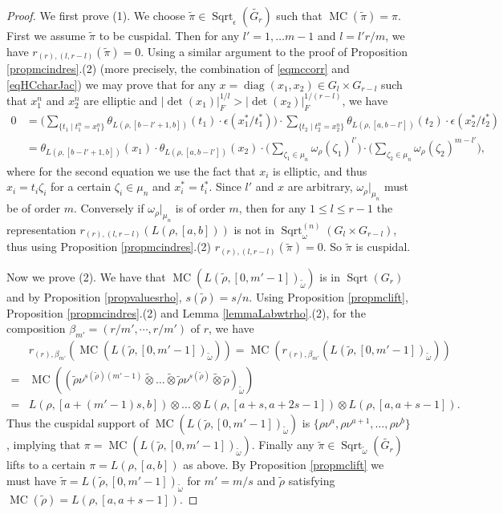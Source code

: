\documentclass{amsart}
\numberwithin{equation}{section}
\newcommand{\abs}[1]{\left|#1\right|_{F}}
\newcommand{\rest}{\lvert}
\newcommand{\mrdet}{\operatorname{det}}
\newcommand{\mrdiag}{\operatorname{diag}}
\newcommand{\mrsqrt}{\operatorname{Sqrt}}
\newcommand{\mrmc}{\operatorname{MC}}
\newcommand{\wt}[1]{\widetilde{#1}}
\begin{document}
	\begin{proof}
		
		We first prove (1). We choose $\wt{\pi}\in\mrsqrt_{\epsilon}(\wt{G_{r}})$ such that $\mrmc(\wt{\pi})=\pi$. First we assume $\wt{\pi}$ to be cuspidal. Then for any $l'=1,\dots m-1$ and $l=l'r/m$, we have $r_{(r),(l,r-l)}(\wt{\pi})=0$. Using a similar argument to the proof of Proposition \ref{propmcindres}.(2) (more precisely, the combination of \eqref{eqmccorr} and \eqref{eqHCcharJac}) we may prove that for any $x=\mrdiag(x_{1},x_{2})\in G_{l}\times G_{r-l}$ such that $x_{1}^{n}$ and $x_{2}^{n}$ are elliptic and $\abs{\mrdet(x_{1})}^{1/l}>\abs{\mrdet(x_{2})}^{1/(r-l)}$, we have
		\begin{align*}
			0&=\bigg(\sum_{\{t_{1}\mid t_{1}^{n}=x_{1}^{n}\}}\theta_{L(\rho,[b-l'+1,b])}(t_{1})\cdot\epsilon(x_{1}^{*}/t_{1}^{*})\bigg)\cdot\sum_{\{t_{2}\mid t_{2}^{n}=x_{2}^{n}\}}\theta_{L(\rho,[a,b-l'])}(t_{2})\cdot\epsilon(x_{2}^{*}/t_{2}^{*})\\
			&=\theta_{L(\rho,[b-l'+1,b])}(x_{1})\cdot\theta_{L(\rho,[a,b-l'])}(x_{2})\cdot\bigg(\sum_{\zeta_{1}\in\mu_{n}}\omega_{\rho}(\zeta_{1})^{l'}\bigg)\cdot\bigg(\sum_{\zeta_{2}\in\mu_{n}}\omega_{\rho}(\zeta_{2})^{m-l'}\bigg),
		\end{align*}
		where for the second equation we use the fact that $x_{i}$ is elliptic, and thus $x_{i}=t_{i}\zeta_{i}$ for a certain $\zeta_{i}\in\mu_{n}$ and $x_{i}^{*}=t_{i}^{*}$.
		Since $l'$ and $x$ are arbitrary,  $\omega_{\rho}\rest_{\mu_{n}}$ must be of order $m$. Conversely if $\omega_{\rho}\rest_{\mu_{n}}$ is of order $m$, then for any $1\leq l\leq r-1$ the representation $r_{(r),(l,r-l)}(L(\rho,[a,b]))$ is not in $\mrsqrt_{\omega}^{(n)}(G_{l}\times G_{r-l})$, thus using Proposition \ref{propmcindres}.(2) $r_{(r),(l,r-l)}(\wt{\pi})=0$. So $\wt{\pi}$ is cuspidal. 
		
		Now we prove (2). We have that $\mrmc(L(\wt{\rho},[0,m'-1])_{\wt{\omega}})$ is in $\mrsqrt(G_{r})$ and by Proposition \ref{propvaluesrho}, $s(\wt{\rho})=s/n$. Using Proposition \ref{propmclift}, Proposition \ref{propmcindres}.(2) and Lemma \ref{lemmaLabwtrho}.(2), for the composition $\beta_{m'}=(r/m',\cdots,r/m')$ of $r$, we have
		\begin{align*}
			&r_{(r),\beta_{m'}}(\mrmc(L(\wt{\rho},[0,m'-1])_{\wt{\omega}}))=\mrmc(r_{(r),\beta_{m'}}(L(\wt{\rho},[0,m'-1])_{\wt{\omega}}))\\
			=&\mrmc((\wt{\rho}\nu^{s(\wt{\rho})(m'-1)}\wt{\otimes}\dots\wt{\otimes}\wt{\rho}\nu^{s(\wt{\rho})}\wt{\otimes}\wt{\rho})_{\wt{\omega}})\\
			=&L(\rho,[a+(m'-1)s,b])\otimes\dots \otimes L(\rho,[a+s,a+2s-1])\otimes L(\rho,[a,a+s-1])  .
		\end{align*}
		Thus the cuspidal support of $\mrmc(L(\wt{\rho},[0,m'-1])_{\wt{\omega}})$ is $\{\rho\nu^{a},\rho\nu^{a+1},\dots,\rho\nu^{b}\}$,  implying that $\pi=\mrmc(L(\wt{\rho},[0,m'-1])_{\wt{\omega}})$. Finally any $\wt{\pi}\in\mrsqrt_{\wt{\omega}}(\wt{G_{r}})$ lifts to a certain $\pi=L(\rho,[a,b])$ as above. By Proposition \ref{propmclift} we must have $\wt{\pi}=L(\wt{\rho},[0,m'-1])_{\wt{\omega}}$ for $m'=m/s$ and $\wt{\rho}$ satisfying $\mrmc(\wt{\rho})=L(\rho,[a,a+s-1])$.
		

\end{proof}
\end{document}

